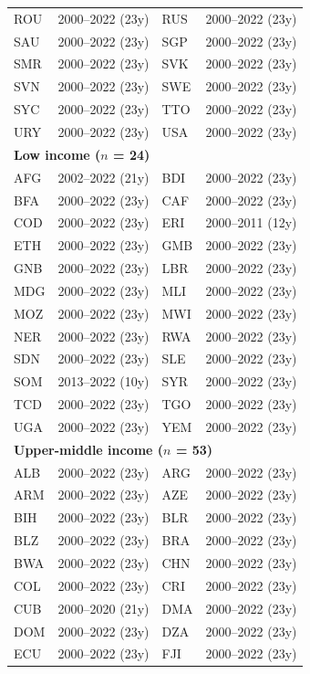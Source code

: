 \documentclass[10pt,a4paper]{article}
\begin{document}
\begin{center}
\begin{longtable}{llll}
ROU & 2000--2022 (23y) & RUS & 2000--2022 (23y) \\
SAU & 2000--2022 (23y) & SGP & 2000--2022 (23y) \\
SMR & 2000--2022 (23y) & SVK & 2000--2022 (23y) \\
SVN & 2000--2022 (23y) & SWE & 2000--2022 (23y) \\
SYC & 2000--2022 (23y) & TTO & 2000--2022 (23y) \\
URY & 2000--2022 (23y) & USA & 2000--2022 (23y) \\
\multicolumn{4}{l}{\textbf{Low income ($n$ = 24)}}\\
AFG & 2002--2022 (21y) & BDI & 2000--2022 (23y) \\
BFA & 2000--2022 (23y) & CAF & 2000--2022 (23y) \\
COD & 2000--2022 (23y) & ERI & 2000--2011 (12y) \\
ETH & 2000--2022 (23y) & GMB & 2000--2022 (23y) \\
GNB & 2000--2022 (23y) & LBR & 2000--2022 (23y) \\
MDG & 2000--2022 (23y) & MLI & 2000--2022 (23y) \\
MOZ & 2000--2022 (23y) & MWI & 2000--2022 (23y) \\
NER & 2000--2022 (23y) & RWA & 2000--2022 (23y) \\
SDN & 2000--2022 (23y) & SLE & 2000--2022 (23y) \\
SOM & 2013--2022 (10y) & SYR & 2000--2022 (23y) \\
TCD & 2000--2022 (23y) & TGO & 2000--2022 (23y) \\
UGA & 2000--2022 (23y) & YEM & 2000--2022 (23y) \\
\multicolumn{4}{l}{\textbf{Upper-middle income ($n$ = 53)}}\\
ALB & 2000--2022 (23y) & ARG & 2000--2022 (23y) \\
ARM & 2000--2022 (23y) & AZE & 2000--2022 (23y) \\
BIH & 2000--2022 (23y) & BLR & 2000--2022 (23y) \\
BLZ & 2000--2022 (23y) & BRA & 2000--2022 (23y) \\
BWA & 2000--2022 (23y) & CHN & 2000--2022 (23y) \\
COL & 2000--2022 (23y) & CRI & 2000--2022 (23y) \\
CUB & 2000--2020 (21y) & DMA & 2000--2022 (23y) \\
DOM & 2000--2022 (23y) & DZA & 2000--2022 (23y) \\
ECU & 2000--2022 (23y) & FJI & 2000--2022 (23y) \\

\end{longtable}
\end{center}
\end{document}
